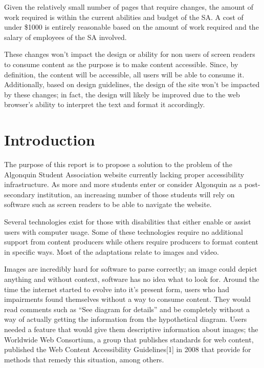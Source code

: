 \documentclass[]{article}
\begin{document}
Given the relatively small number of pages that require changes, the
amount of work required is within the current abilities and budget of
the SA. A cost of under \$1000 is entirely reasonable based on the
amount of work required and the salary of employees of the SA involved.

These changes won't impact the design or ability for non users of screen
readers to consume content as the purpose is to make content accessible.
Since, by definition, the content will be accessible, all users will be
able to consume it. Additionally, based on design guidelines, the design
of the site won't be impacted by these changes; in fact, the design will
likely be improved due to the web browser's ability to interpret the
text and format it accordingly.

\clearpage
\renewcommand{\contentsname}{Table of Contents}
 \tableofcontents
\clearpage
{} \listoffigures
\clearpage
{}

\section{Introduction}\label{introduction}

The purpose of this report is to propose a solution to the problem of
the Algonquin Student Association website currently lacking proper
accessibility infrastructure. As more and more students enter or
consider Algonquin as a post-secondary institution, an increasing number
of those students will rely on software such as screen readers to be
able to navigate the website.

Several technologies exist for those with disabilities that either
enable or assist users with computer usage. Some of these technologies
require no additional support from content producers while others
require producers to format content in specific ways. Most of the
adaptations relate to images and video.

Images are incredibly hard for software to parse correctly; an image
could depict anything and without context, software has no idea what to
look for. Around the time the internet started to evolve into it's
present form, users who had impairments found themselves without a way
to consume content. They would read comments such as ``See diagram for
details'' and be completely without a way of actually getting the
information from the hypothetical diagram. Users needed a feature that
would give them descriptive information about images; the Worldwide Web
Consortium, a group that publishes standards for web content, published
the Web Content Accessibility Guidelines{[}1{]} in 2008 that provide for
methods that remedy this situation, among others.
\end{document}
